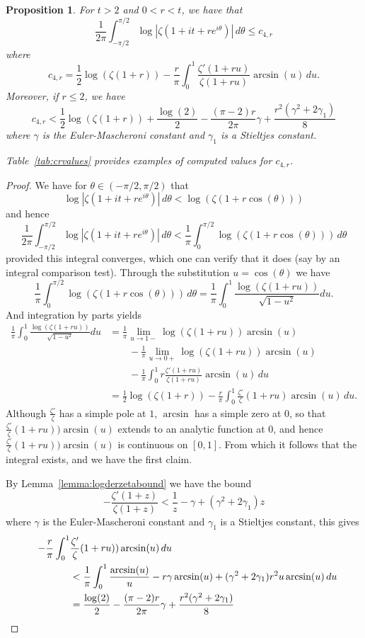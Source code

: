\documentclass[10pt,english,letter, reqno]{amsart}
\theoremstyle{plain}
\newtheorem{proposition}[theorem]{Proposition}
\theoremstyle{definition}
\begin{document}
\begin{proposition}\label{prop:integraloutside}
For $t>2$ and $0<r<t$, we have that
\[  \frac{1}{2\pi}\int_{-\pi/2}^{\pi/2}  \log|\zeta(1+it+re^{i\theta})|\,d\theta
\leq c_{4,r} \]
where 
\[ c_{4,r} = \frac{1}{2}\log(\zeta(1+r)) -\frac{r}{\pi}\int_{0}^{1} \frac{\zeta'(1+ru)}{\zeta(1+ru)}\arcsin(u)\,du .\]
Moreover, if $r\leq 2$, we have
\[ c_{4,r} <  \frac{1}{2}\log(\zeta(1+r)) + \frac{\log(2)}{2} - \frac{(\pi-2)r}{2\pi}\gamma  + \frac{r^2(\gamma^2+2\gamma_1)}{8} \]
where $\gamma$ is the Euler-Mascheroni constant and $\gamma_1$ is a Stieltjes constant.

Table~\ref{tab:crvalues} provides examples of computed values for $c_{4,r}$. 
\end{proposition}
\begin{proof}
We have for $\theta\in (-\pi/2,\pi/2)$ that 
\[ \log|\zeta(1+it+re^{i\theta})|\,d\theta  <  \log(\zeta(1+r\cos(\theta))) \]
and hence
\[ \frac{1}{2\pi}\int_{-\pi/2}^{\pi/2}  \log|\zeta(1+it+re^{i\theta})|\,d\theta < 
\frac{1}{\pi}\int_{0}^{\pi/2} \log(\zeta(1+r\cos(\theta)))\,d\theta
\]
 provided this integral converges, which one can verify that it does (say by an integral comparison test).
Through the substitution $u=\cos(\theta)$ we have
\[ \frac{1}{\pi}\int_{0}^{\pi/2} \log(\zeta(1+r\cos(\theta)))\,d\theta
= \frac{1}{\pi}\int_{0}^{1} \frac{\log(\zeta(1+ru))}{\sqrt{1-u^2}}du.
\]
And integration by parts yields
\begin{align*}
\frac{1}{\pi}\int_{0}^{1} \frac{\log(\zeta(1+ru))}{\sqrt{1-u^2}}du &= 
\frac{1}{\pi}\lim_{u\rightarrow 1-} \log(\zeta(1+ru))\arcsin(u)
\\&\qquad -
\frac{1}{\pi}\lim_{u\rightarrow 0+} \log(\zeta(1+ru))\arcsin(u)\\&\qquad -
\frac{1}{\pi}\int_{0}^{1} r\frac{\zeta'(1+ru)}{\zeta(1+ru)}\arcsin(u)\,du \\
&= \frac{1}{2}\log(\zeta(1+r)) -\frac{r}{\pi}\int_{0}^{1} \frac{\zeta'}{\zeta}(1+ru)\arcsin(u)\,du.
\end{align*}
Although $\frac{\zeta'}{\zeta}$ has a simple pole at $1$, $\arcsin$ has a simple zero at $0$, so that
$\frac{\zeta'}{\zeta}(1+ru))\arcsin(u)$ extends to an analytic function at $0$, and hence $\frac{\zeta'}{\zeta}(1+ru))\arcsin(u)$ is continuous on $[0,1]$. From which it follows that the integral exists, and we have the first claim.

By Lemma~\ref{lemma:logderzetabound}  we have the bound
\[ -\frac{\zeta'(1+z)}{\zeta(1+z)} < \frac{1}{z} - \gamma +  (\gamma^2+2\gamma_1)z \]
where $\gamma$ is the Euler-Mascheroni constant and $\gamma_1$ is a Stieltjes constant, this gives
\begin{align*} -\frac{r}{\pi}\int_{0}^{1} &\frac{\zeta'}{\zeta}(1+ru))\arcsin(u)\,du \\\qquad\qquad&< \frac{1}{\pi}\int_{0}^{1} \frac{\arcsin(u)}{u} - r\gamma\arcsin(u) + (\gamma^2+2\gamma_1)r^2u\arcsin(u)\,du \\
&= \frac{\log(2)}{2} - \frac{(\pi-2)r}{2\pi}\gamma  + \frac{r^2(\gamma^2+2\gamma_1)}{8}\qedhere
\end{align*}
\end{proof}
\end{document}
